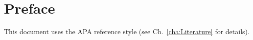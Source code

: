 \chapter{Preface}

This document uses the APA reference style (see Ch.\ \ref{cha:Literature} for details).




